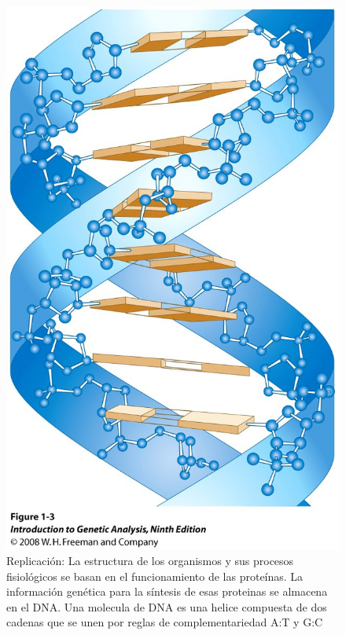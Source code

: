 \documentclass[10pt]{article}
\begin{document}
\begin{figure}[htb!]
\includegraphics[scale=0.3]{./figures/figure03.jpg}
\caption{ Replicación: La estructura de los organismos y sus procesos fisiológicos se basan
en el funcionamiento de las proteínas. La información genética para la síntesis
de esas proteinas se almacena en el DNA. Una molecula de DNA es una helice
compuesta de dos cadenas que se unen por reglas de complementariedad A:T y
G:C}
\end{figure}
\end{document}
